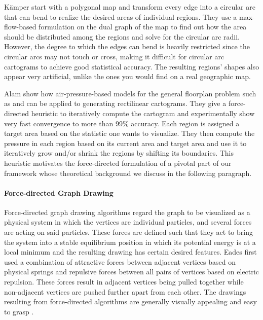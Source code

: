 Kämper \etal{} \cite{kamper2013circular} start with a polygonal map and transform every edge into a circular arc that can bend to realize the desired areas of individual regions.
They use a max-flow-based formulation on the dual graph of the map to find out how the area should be distributed among the regions and solve for the circular arc radii.
However, the degree to which the edges can bend is heavily restricted since the circular arcs may not touch or cross, making it difficult for circular arc cartograms to achieve good statistical accuracy.
The resulting regions' shapes also appear very artificial, unlike the ones you would find on a real geographic map.

Alam \etal{} \cite{alam2013computing} show how air-pressure-based models for the general floorplan problem such as \cite{izumi1998air} and \cite{felsner2013exploiting} can be applied to generating rectilinear cartograms.
They give a force-directed heuristic to iteratively compute the cartogram and experimentally show very fast convergence to more than 99\% accuracy.
Each region is assigned a target area based on the statistic one wants to visualize.
They then compute the pressure in each region based on its current area and target area and use it to iteratively grow and/or shrink the regions by shifting its boundaries.
This heuristic motivates the force-directed formulation of a pivotal part of our framework whose theoretical background we discuss in the following paragraph.


\paragraph{Force-directed Graph Drawing}

Force-directed graph drawing algorithms regard the graph to be visualized as a physical system in which the vertices are individual particles, and several forces are acting on said particles.
These forces are defined such that they act to bring the system into a stable equilibrium position in which its potential energy is at a local minimum and the resulting drawing has certain desired features.
Eades \cite{eades84heuristic} first used a combination of attractive forces between adjacent vertices based on physical springs and repulsive forces between all pairs of vertices based on electric repulsion.
These forces result in adjacent vertices being pulled together while non-adjacent vertices are pushed further apart from each other.
The drawings resulting from force-directed algorithms are generally visually appealing and easy to grasp \cite{kobourov2013force}.

